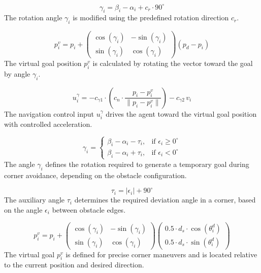 \documentclass[conference]{IEEEtran}
\begin{document}
\begin{equation}
\gamma_i = \beta_i - \alpha_i + c_r \cdot 90^\circ
\label{eq:28}
\end{equation}
The rotation angle $\gamma_i$ is modified using the predefined rotation direction $c_r$.

\begin{equation}
p^{v}_i = p_i +
\begin{pmatrix}
\cos(\gamma_i) & -\sin(\gamma_i) \\
\sin(\gamma_i) & \cos(\gamma_i)
\end{pmatrix}
(p_d - p_i)
\label{eq:29}
\end{equation}
The virtual goal position $p^v_i$ is calculated by rotating the vector toward the goal by angle $\gamma_i$.

\begin{equation}
u^{\gamma}_i = -c_{\gamma 1} \cdot \left( c_n \cdot \frac{p_i - p^v_i}{\| p_i - p^v_i \|} \right) - c_{\gamma 2} \, v_i
\label{eq:30}
\end{equation}
The navigation control input $u^{\gamma}_i$ drives the agent toward the virtual goal position with controlled acceleration.

\begin{equation}
\gamma_i =
\begin{cases}
\beta_i - \alpha_i - \tau_i, & \text{if } \epsilon_i \geq 0^\circ \\
\beta_i - \alpha_i + \tau_i, & \text{if } \epsilon_i < 0^\circ
\end{cases}
\label{eq:31}
\end{equation}
The angle $\gamma_i$ defines the rotation required to generate a temporary goal during corner avoidance, depending on the obstacle configuration.

\begin{equation}
\tau_i = | \epsilon_i | + 90^\circ
\label{eq:32}
\end{equation}
The auxiliary angle $\tau_i$ determines the required deviation angle in a corner, based on the angle $\epsilon_i$ between obstacle edges.

\begin{equation}
p^v_i = p_i +
\begin{pmatrix}
\cos(\gamma_i) & -\sin(\gamma_i) \\
\sin(\gamma_i) & \cos(\gamma_i)
\end{pmatrix}
\begin{pmatrix}
0.5 \cdot d_s \cdot \cos(\theta^d_i) \\
0.5 \cdot d_s \cdot \sin(\theta^d_i)
\end{pmatrix}
\label{eq:33}
\end{equation}
The virtual goal $p^v_i$ is defined for precise corner maneuvers and is located relative to the current position and desired direction.
\end{document}
